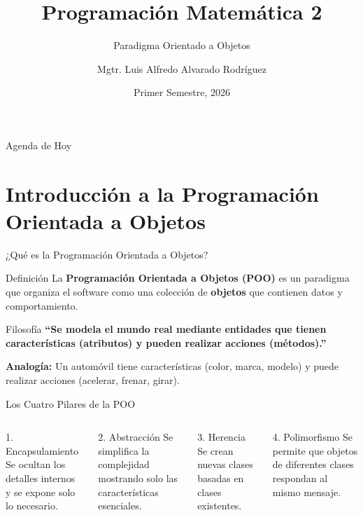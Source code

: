 \documentclass[aspectratio=169]{beamer}
\title[M503]{Programación Matemática 2}
\subtitle{Paradigma Orientado a Objetos}
\author[Luis Alfredo Alvarado]{Mgtr. Luis Alfredo Alvarado Rodríguez}
\institute[ECFM - USAC]{
    Escuela de Ciencias Físicas y Matemáticas \\
    Universidad de San Carlos de Guatemala
}
\date{Primer Semestre, 2026}
\begin{document}
\begin{frame}
    \titlepage
\end{frame}

\begin{frame}{Agenda de Hoy}
    \tableofcontents
\end{frame}

\section{Introducción a la Programación Orientada a Objetos}

\begin{frame}{¿Qué es la Programación Orientada a Objetos?}
    \begin{block}{Definición}
        La \textbf{Programación Orientada a Objetos (POO)} es un paradigma que organiza el software como una colección de \textbf{objetos} que contienen datos y comportamiento.
    \end{block}
    \vspace{0.5cm}
    
    \begin{alertblock}{Filosofía}
        \textbf{``Se modela el mundo real mediante entidades que tienen características (atributos) y pueden realizar acciones (métodos).''}
    \end{alertblock}
    \vspace{0.3cm}
    
    \textbf{Analogía:} Un automóvil tiene características (color, marca, modelo) y puede realizar acciones (acelerar, frenar, girar).
\end{frame}

\begin{frame}{Los Cuatro Pilares de la POO}
    \begin{columns}[t]
        \begin{block}{1. Encapsulamiento}
            Se ocultan los detalles internos y se expone solo lo necesario.
        \end{block}
        \vspace{0.3cm}
        \begin{block}{2. Abstracción}
            Se simplifica la complejidad mostrando solo las características esenciales.
        \end{block}
        
        \begin{block}{3. Herencia}
            Se crean nuevas clases basadas en clases existentes.
        \end{block}
        \vspace{0.3cm}
        \begin{block}{4. Polimorfismo}
            Se permite que objetos de diferentes clases respondan al mismo mensaje.
        \end{block}
    \end{columns}
\end{frame}
\end{document}
